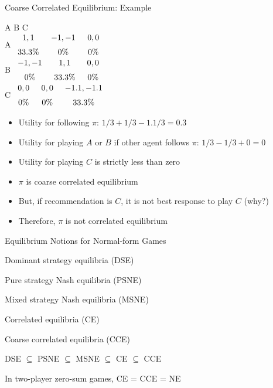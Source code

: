 \documentclass[11pt,aspectratio=169]{beamer}
\begin{document}
  
  \begin{frame}{Coarse Correlated Equilibrium: Example}
   \begin{center}\scriptsize
   \renewcommand{\gamestretch}{2.5}
    \hspace{-3.2em}
    \begin{game}{3}{3}
         \> A								\> B     							\> C											\\
     A   \> $\stackedpayoffs{1, 1}{33.3\%}$	\> $\stackedpayoffs{-1, -1}{0\%}$		\> $\stackedpayoffs{0, 0}{0\%}$				\\
     B   \> $\stackedpayoffs{-1,  -1}{0\%}$	\> $\stackedpayoffs{1,  1}{33.3\%}$	\> $\stackedpayoffs{0, 0}{0\%}$				\\
     C   \> $\stackedpayoffs{0,  0}{0\%}$		\> $\stackedpayoffs{0,  0}{0\%}$		\> $\stackedpayoffs{-1.1, -1.1}{33.3\%}$	\\
    \end{game}
   \end{center}
   \vspace{1em}
   \begin{itemize}[<+->] \footnotesize
    \item Utility for following $\pi$: $1/3 + 1/3 - 1.1/3 = 0.3$
    \item Utility for playing $A$ or $B$ if other agent follows $\pi$: $1/3 - 1/3 + 0 = 0$
    \item Utility for playing $C$ is strictly less than zero
    \item $\pi$ \alert{is coarse correlated} equilibrium 
    \item But, if recommendation is $C$, it is not best response to play $C$ (why?)
    \item Therefore, $\pi$ \alert{is not correlated equilibrium}
   \end{itemize}
  \end{frame}
  
  
  \begin{frame}{Equilibrium Notions for Normal-form Games}
   \begin{itemizes}
    \item Dominant strategy equilibria (DSE)
    \item Pure strategy Nash equilibria (PSNE)
    \item Mixed strategy Nash equilibria (MSNE)
    \item Correlated equilibria (CE)
    \item Coarse correlated equilibria (CCE)
    \item<2-> DSE $\subseteq$ PSNE $\subseteq$ MSNE $\subseteq$ CE $\subseteq$ CCE
    \item<3-> In two-player zero-sum games, CE = CCE = NE 
   \end{itemizes}
  \end{frame}
  
\end{document}
